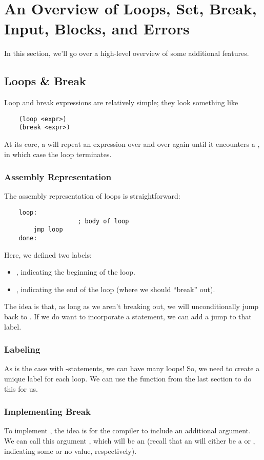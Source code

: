 \documentclass[letterpaper]{article}
\begin{document}
\section{An Overview of Loops, Set, Break, Input, Blocks, and Errors}
In this section, we'll go over a high-level overview of some additional features. 

\subsection{Loops \& Break}
Loop and break expressions are relatively simple; they look something like 
\begin{verbatim}
    (loop <expr>)
    (break <expr>)\end{verbatim}
At its core, a  will repeat an expression over and over again until it encounters a , in which case the loop terminates.

\subsubsection{Assembly Representation} 
The assembly representation of loops is straightforward:
\begin{verbatim}
    loop: 
                    ; body of loop 
        jmp loop 
    done:\end{verbatim}
Here, we defined two labels: 
\begin{itemize}
    \item {}, indicating the beginning of the loop. 
    \item {}, indicating the end of the loop (where we should ``break'' out).
\end{itemize}
The idea is that, as long as we aren't breaking out, we will unconditionally jump back to . If we do want to incorporate a  statement, we can add a jump to that label.

\subsubsection{Labeling}
As is the case with -statements, we can have many loops! So, we need to create a unique label for each loop. We can use the  function from the last section to do this for us. 

\subsubsection{Implementing Break}
To implement , the idea is for the compiler to include an additional argument. We can call this argument , which will be an  (recall that an  will either be a  or , indicating some or no value, respectively).
\end{document}

